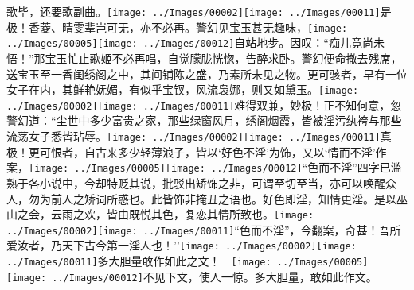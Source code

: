 歌毕，还要歌副曲。{\texttt{[image: ../Images/00002]}\texttt{[image: ../Images/00011]}\footnotesize \kaishu 是极！香菱、晴雯辈岂可无，亦不必再。}警幻见宝玉甚无趣味，{\texttt{[image: ../Images/00005]}\texttt{[image: ../Images/00012]}\footnotesize \kaishu 自站地步。}因叹：``痴儿竟尚未悟！''那宝玉忙止歌姬不必再唱，自觉朦胧恍惚，告醉求卧。警幻便命撤去残席，送宝玉至一香闺绣阁之中，其间铺陈之盛，乃素所未见之物。更可骇者，早有一位女子在内，其鲜艳妩媚，有似乎宝钗，风流袅娜，则又如黛玉。{\texttt{[image: ../Images/00002]}\texttt{[image: ../Images/00011]}\footnotesize \kaishu 难得双兼，妙极！}正不知何意，忽警幻道：``尘世中多少富贵之家，那些绿窗风月，绣阁烟霞，皆被淫污纨袴与那些流荡女子悉皆玷辱。{\texttt{[image: ../Images/00002]}\texttt{[image: ../Images/00011]}\footnotesize \kaishu 真极！}更可恨者，自古来多少轻薄浪子，皆以`好色不淫'为饰，又以`情而不淫'作案，{\texttt{[image: ../Images/00005]}\texttt{[image: ../Images/00012]}\footnotesize \kaishu ``色而不淫''四字已滥熟于各小说中，今却特贬其说，批驳出矫饰之非，可谓至切至当，亦可以唤醒众人，勿为前人之矫词所惑也。}此皆饰非掩丑之语也。好色即淫，知情更淫。是以巫山之会，云雨之欢，皆由既悦其色，复恋其情所致也。{\texttt{[image: ../Images/00002]}\texttt{[image: ../Images/00011]}\footnotesize \kaishu ``色而不淫''，今翻案，奇甚！}吾所爱汝者，乃天下古今第一淫人也！''{{\texttt{[image: ../Images/00002]}\texttt{[image: ../Images/00011]}\footnotesize \kaishu 多大胆量敢作如此之文！　}\texttt{[image: ../Images/00005]}\texttt{[image: ../Images/00012]}\footnotesize \kaishu 不见下文，使人一惊。多大胆量，敢如此作文。}

